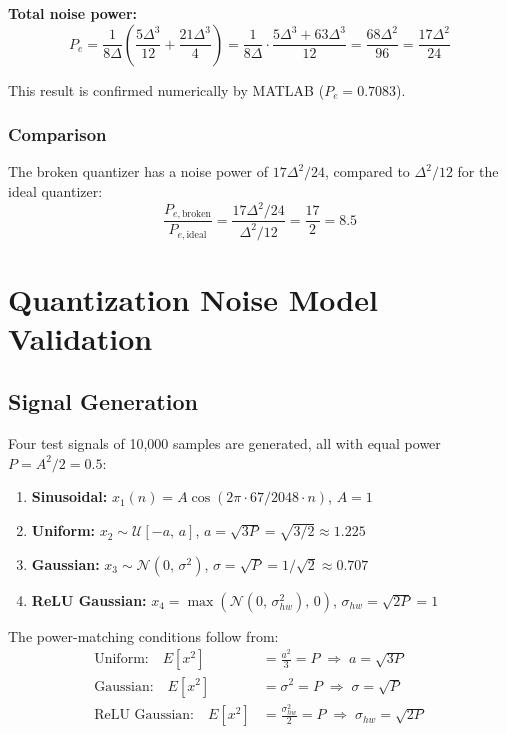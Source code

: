\documentclass{article}
\begin{document}
  \textbf{Total noise power:}
  \begin{equation}
      P_e = \frac{1}{8\Delta}\left(\frac{5\Delta^3}{12} + \frac{21\Delta^3}{4}\right)
      = \frac{1}{8\Delta} \cdot \frac{5\Delta^3 + 63\Delta^3}{12}
      = \frac{68\Delta^2}{96}
      = \boxed{\frac{17\Delta^2}{24}}
  \end{equation}

  This result is confirmed numerically by MATLAB ($P_e = 0.7083$).

  \subsubsection{Comparison}

  The broken quantizer has a noise power of $17\Delta^2/24$, compared to $\Delta^2/12$ for the ideal quantizer:
  \begin{equation}
      \frac{P_{e,\text{broken}}}{P_{e,\text{ideal}}} = \frac{17\Delta^2/24}{\Delta^2/12} = \frac{17}{2} = 8.5
  \end{equation}
  

  \section{Quantization Noise Model Validation}

  

  \subsection{Signal Generation}

  Four test signals of 10{,}000 samples are generated, all with equal power $P = A^2/2 = 0.5$:
  \begin{enumerate}
      \item \textbf{Sinusoidal:} $x_1(n) = A\cos(2\pi \cdot 67/2048 \cdot n)$, $A = 1$
      \item \textbf{Uniform:} $x_2 \sim \mathcal{U}[-a,\, a]$, $a = \sqrt{3P} = \sqrt{3/2} \approx 1.225$
      \item \textbf{Gaussian:} $x_3 \sim \mathcal{N}(0,\, \sigma^2)$, $\sigma = \sqrt{P} = 1/\sqrt{2} \approx 0.707$
      \item \textbf{ReLU Gaussian:} $x_4 = \max(\mathcal{N}(0,\, \sigma_{hw}^2),\, 0)$, $\sigma_{hw} = \sqrt{2P} = 1$
  \end{enumerate}

  The power-matching conditions follow from:
  \begin{align}
      \text{Uniform:} \quad E[x^2] &= \frac{a^2}{3} = P \;\Rightarrow\; a = \sqrt{3P} \\
      \text{Gaussian:} \quad E[x^2] &= \sigma^2 = P \;\Rightarrow\; \sigma = \sqrt{P} \\
      \text{ReLU Gaussian:} \quad E[x^2] &= \frac{\sigma_{hw}^2}{2} = P \;\Rightarrow\; \sigma_{hw} = \sqrt{2P}
  \end{align}
\end{document}
